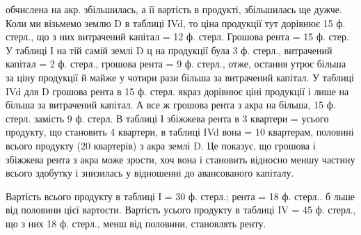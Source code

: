 обчислена на акр. збільшилась, а її вартість в продукті, збільшилась ще дужче.
Коли ми візьмемо землю D в таблиці IVd, то ціна продукції тут дорівнює
15 ф. стерл., що з них витрачений капітал = 12  ф. стерл. Грошова рента = 15
ф. стер. У таблиці І на тій самій землі D ц на продукції була 3 ф. стерл., витрачений
капітал = 2  ф. стерл., грошова рента = 9 ф. стерл., отже, остання
утроє більша за ціну продукції й майже у чотири рази більша за витрачений
капітал. У таблиці IVd для D грошова рента в 15 ф. стерл. якраз дорівнює ціні
продукції і лише на   більша за витрачений капітал. А все ж грошова рента
з акра на   більша, 15 ф. стерл. замість 9 ф. стерл. В таблиці І збіжжева
рента в 3 квартери =   усього продукту, що становить 4 квартери, в таблиці
IVd вона = 10 квартерам, половині всього продукту (20 квартерів) з акра
землі D. Це показує, що грошова і збіжжева рента з акра може зрости, хоч
вона і становить відносно меншу частину всього здобутку і знизилась у відношенні
до авансованого капіталу.

Вартість всього продукту в таблиці І = 30 ф. стерл.; рента = 18 ф.
стерл.. б льше від половини цієї вартости. Вартість усього продукту в таблиці
IV = 45 ф. стерл., що з них 18 ф. стерл., менш від половини, становлять
ренту.
